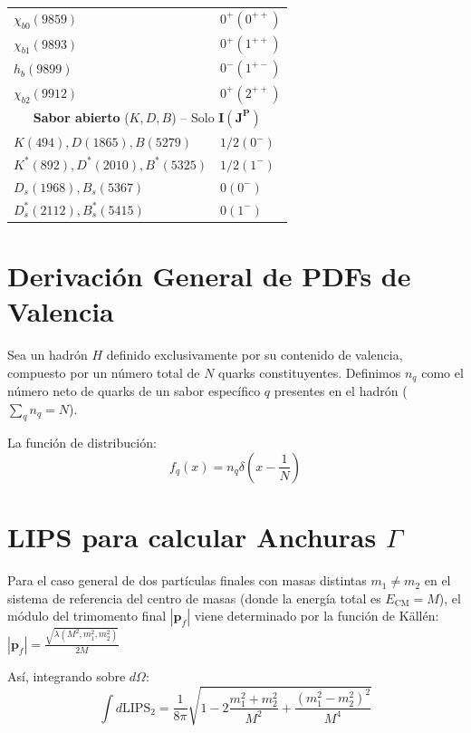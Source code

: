 {\begin{tabular}{ll}
$\chi_{b0}(9859)$ & $0^+(0^{++})$ \\
$\chi_{b1}(9893)$ & $0^+(1^{++})$ \\
$h_b(9899)$ & $0^-(1^{+-})$ \\
$\chi_{b2}(9912)$ & $0^+(2^{++})$ \\
\midrule
\multicolumn{2}{c}{\textbf{Sabor abierto} ($K, D, B$) -- Solo $\mathbf{I(J^P)}$} \\
\midrule
$K(494), D(1865), B(5279)$ & $1/2(0^-)$ \\
$K^*(892), D^*(2010), B^*(5325)$ & $1/2(1^-)$ \\
$D_s(1968), B_s(5367)$ & $0(0^-)$ \\
$D_s^*(2112), B_s^*(5415)$ & $0(1^-)$ \\
\bottomrule
\end{tabular}

}


\section*{Derivación General de PDFs de Valencia}

Sea un hadrón $H$ definido exclusivamente por su contenido de valencia, compuesto por un número total de $N$ quarks constituyentes. Definimos $n_q$ como el número neto de quarks de un sabor específico $q$ presentes en el hadrón ($\sum_{q} n_q = N$).

La función de distribución: 
$$f_q(x) = n_q \delta\left(x - \frac{1}{N}\right)$$


\section*{LIPS para calcular Anchuras $\Gamma$}

Para el caso general de dos partículas finales con masas distintas $m_1 \neq m_2$ en el sistema de referencia del centro de masas (donde la energía total es $E_{\text{CM}} = M$), el módulo del trimomento final $|\mathbf{p}_f|$ viene determinado por la función de Källén:$|\mathbf{p}_f| = \frac{\sqrt{\lambda(M^2, m_1^2, m_2^2)}}{2M}$

Así, integrando sobre $d\Omega$: 
$$\int d\text{LIPS}_2 = \frac{1}{8\pi} \sqrt{1 - 2\frac{m_1^2 + m_2^2}{M^2} + \frac{(m_1^2 - m_2^2)^2}{M^4}}$$

